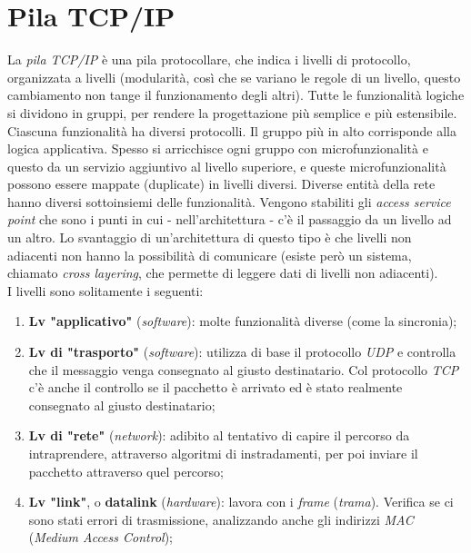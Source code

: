 \section{Pila TCP/IP}
La \textit{pila TCP/IP} è una pila protocollare, che indica i livelli di protocollo, organizzata a livelli (modularità, così che se variano le regole di un livello, questo cambiamento non tange il funzionamento degli altri).
Tutte le funzionalità logiche si dividono in gruppi, per rendere la progettazione più semplice e più estensibile.
\\
Ciascuna funzionalità ha diversi protocolli.
Il gruppo più in alto corrisponde alla logica applicativa.
Spesso si arricchisce ogni gruppo con microfunzionalità e questo da un servizio aggiuntivo al livello superiore, e queste microfunzionalità possono essere mappate (duplicate) in livelli diversi.
Diverse entità della rete hanno diversi sottoinsiemi delle funzionalità.
Vengono stabiliti gli \textit{access service point} che sono i punti in cui - nell'architettura - c'è il passaggio da un livello ad un altro.
Lo svantaggio di un'architettura di questo tipo è che livelli non adiacenti non hanno la possibilità di comunicare (esiste però un sistema, chiamato \textit{cross layering}, che permette di leggere dati di livelli non adiacenti).
\\
I livelli sono solitamente i seguenti:
\begin{enumerate}
    \item \textbf{Lv "applicativo"} (\textit{software}): molte funzionalità diverse (come la sincronia);
    \item \textbf{Lv di "trasporto"} (\textit{software}): utilizza di base il protocollo \textit{UDP} e controlla che il messaggio venga consegnato al giusto destinatario. Col protocollo \textit{TCP} c'è anche il controllo se il pacchetto è arrivato ed è stato realmente consegnato al giusto destinatario;
    \item \textbf{Lv di "rete"} (\textit{network}): adibito al tentativo di capire il percorso da intraprendere, attraverso algoritmi di instradamenti, per poi inviare il pacchetto attraverso quel percorso;
    \item \textbf{Lv "link"}, o \textbf{datalink} (\textit{hardware}): lavora con i \textit{frame} (\textit{trama}). Verifica se ci sono stati errori di trasmissione, analizzando anche gli indirizzi \textit{MAC} (\textit{Medium Access Control});
\end{enumerate}
